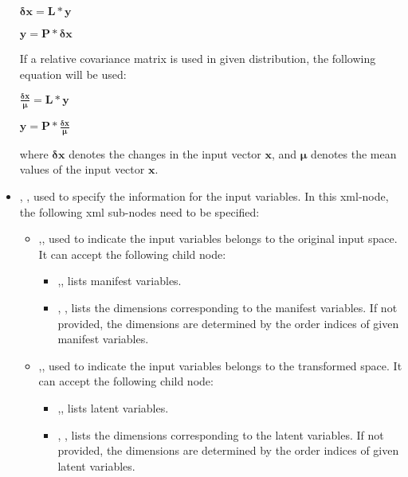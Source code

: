 \begin{itemize}
  $
  \mathbf{\delta x} = \mathbf L * \mathbf y
  $

  $
  \mathbf y = \mathbf P * \mathbf \delta \mathbf x
  $

  If a relative covariance matrix is used in given distribution, the following equation will be used:

  $
  \frac{\mathbf \delta \mathbf x}{\mathbf \mu} = \mathbf L * \mathbf y
  $

  $
  \mathbf y = \mathbf P * {\frac{\mathbf \delta \mathbf x}{\mathbf \mu}}
  $

  where $\mathbf{\delta x}$ denotes the changes in the input vector $\mathbf x$, and $\mathbf \mu$ denotes the mean values of the input vector $\mathbf x$.

  \item {}, , used to specify the information for the input variables.
  In this xml-node, the following xml sub-nodes need to be specified:
    \begin{itemize}
      \item {},, used to indicate the input variables belongs to the original input space.
      It can accept the following child node:
        \begin{itemize}
          \item {},, lists manifest variables.
          \item {}, , lists the dimensions corresponding to the manifest variables.
          If not provided, the dimensions are determined by the order indices of given manifest variables.
        \end{itemize}
      \item {},, used to indicate the input variables belongs to the transformed space.
      It can accept the following child node:
        \begin{itemize}
          \item {},, lists latent variables.
          \item {}, , lists the dimensions corresponding to the latent variables.
          If not provided, the dimensions are determined by the order indices of given latent variables.

\end{itemize}
\end{itemize}
\end{itemize}
